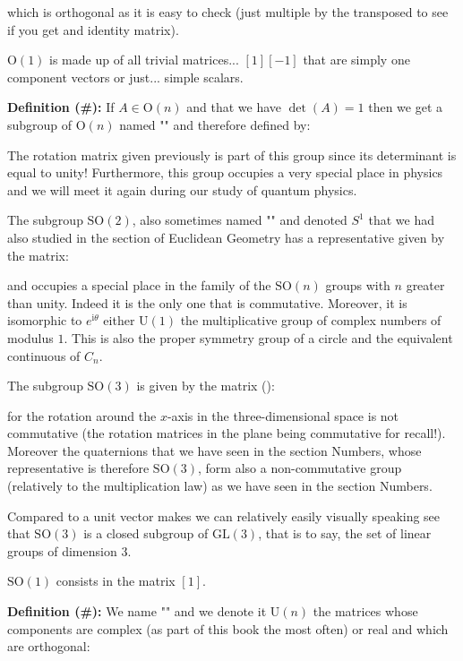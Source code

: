 	which is orthogonal as it is easy to check (just multiple by the transposed to see if you get and identity matrix).
	\begin{tcolorbox}[title=Remark,colframe=black,arc=10pt]
	$\text{O}(1)$ is  made up of all trivial matrices... $[1] [-1]$ that are simply one component vectors or just... simple scalars.
	\end{tcolorbox}
	\textbf{Definition (\#\mydef):} If $A\in \text{O}(n)$ and that we have $\det(A)=1$ then we get a subgroup of $\text{O}(n)$ named "\label{special real group orthogonal}" and therefore defined by:
	
	The rotation matrix given previously is part of this group since its determinant is equal to unity! Furthermore, this group occupies a very special place in physics and we will meet it again during our study of quantum physics.
	
	The subgroup $\text{SO}(2)$, also sometimes named "" and denoted $S^1$ that we had also studied in the section of Euclidean Geometry has a representative given by the matrix:
	
	and occupies a special place in the family of the $\text{SO}(n)$ groups  with $n$ greater than unity. Indeed it is the only one that is commutative. Moreover, it is isomorphic to $e^{\mathrm{i}\theta}$ either $\text{U}(1)$ the multiplicative group of complex numbers of modulus $1$. This is also the proper symmetry group of a circle and the equivalent continuous of $C_n$.
	
	The subgroup $\text{SO}(3)$ is given by the matrix ():
	
	for the rotation around the $x$-axis in the three-dimensional space is not commutative (the rotation matrices in the plane being commutative for recall!). Moreover the quaternions that we have seen in the section Numbers, whose representative is therefore $\text{SO}(3)$, form also a non-commutative group (relatively to the multiplication law) as we have seen in the section Numbers.
	
	Compared to a unit vector makes we can relatively easily visually speaking see that $\text{SO} (3)$ is a closed subgroup of $\text{GL} (3)$, that is to say, the set of linear groups of dimension $3$.
	
	\begin{tcolorbox}[title=Remark,colframe=black,arc=10pt]
	$\text{SO} (1)$ consists in the matrix $[1]$.
	\end{tcolorbox}	
	\textbf{Definition (\#\mydef):} We name "\label{unitary linear group}" and we denote it $\text{U}(n)$ the matrices whose components are complex (as part of this book the most often) or real and which are orthogonal:
	
